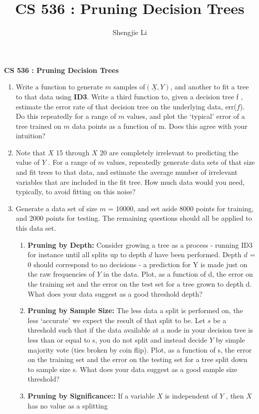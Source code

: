 \documentclass[letter, 12pt]{article}
\author{Shengjie Li}
\title{CS 536 : Pruning Decision Trees}
\begin{document}
    \centerline{\textbf{CS 536 : Pruning Decision Trees}}
    \begin{enumerate}
        \item {Write a function to generate $ m $ samples of$  (\underline{X}, Y) $, and another to fit a tree to that data using \textbf{ID3}. Write a
        	third function to, given a decision tree f , estimate the error rate of that decision tree on the underlying data,
        	err($ f $). Do this repeatedly for a range of $ m $ values, and plot the ‘typical’ error of a tree trained on $ m $ data
        	points as a function of m. Does this agree with your intuition?}
        \item{Note that $ X $ 15 through $ X $ 20 are completely irrelevant to predicting the value of $ Y $ . For a range of $ m $ values,
        	repeatedly generate data sets of that size and fit trees to that data, and estimate the average number of
        	irrelevant variables that are included in the fit tree. How much data would you need, typically, to avoid fitting
        	on this noise?}
        \item{Generate a data set of size $ m $ = 10000, and set aside 8000 points for training, and 2000 points for testing. The
        	remaining questions should all be applied to this data set.}
        \begin{enumerate}
        	\item {\textbf{Pruning by Depth:} Consider growing a tree as a process - running ID3 for instance until all splits
        		up to depth $ d $ have been performed. Depth $ d $ = 0 should correspond to no decisions - a prediction for Y
        		is made just on the raw frequencies of $ Y $ in the data. Plot, as a function of d, the error on the training
        		set and the error on the test set for a tree grown to depth d. What does your data suggest as a good
        		threshold depth?}
        	\item {\textbf{Pruning by Sample Size:} The less data a split is performed on, the less ‘accurate’ we expect the
        		result of that split to be. Let $ s $ be a threshold such that if the data available at a node in your decision
        		tree is less than or equal to s, you do not split and instead decide $ Y $ by simple majority vote (ties broken
        		by coin flip). Plot, as a function of s, the error on the training set and the error on the testing set for a
        		tree split down to sample size s. What does your data suggest as a good sample size threshold?}
        	\item {\textbf{Pruning by Significance::} If a variable $ X $ is independent of $ Y $ , then $ X $ has no value as a splitting
}
\end{enumerate}
\end{enumerate}
\end{document}
